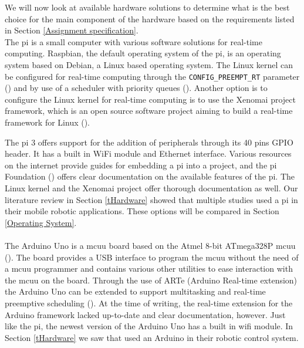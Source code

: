 \documentclass[12pt]{scrreprt}
\begin{document}
We will now look at available hardware solutions to determine what is the best choice for the main component of the hardware based on the requirements listed in Section \ref{Assignment specification}.
\\
The \gls{pi} is a small computer with various software solutions for real-time computing. Raspbian, the default operating system of the \gls{pi}, is an operating system based on Debian, a Linux based operating system. The Linux kernel can be configured for real-time computing through the \texttt{CONFIG_PREEMPT_RT} parameter (\cite{rtwiki}) and by use of a scheduler with priority queues (\cite{linux_scheduling}). Another option is to configure the Linux kernel for real-time computing is to use the Xenomai project framework, which is an open source software project aiming to build a real-time framework for Linux (\cite{xenomai}). 
\par
The \gls{pi} 3 offers support for the addition of peripherals through its 40 pins GPIO header. It has a built in WiFi module and Ethernet interface. Various resources on the internet provide guides for embedding a \gls{pi} into a project, and the \gls{pi} Foundation (\cite{foundation}) offers clear documentation on the available features of the \gls{pi}. The Linux kernel and the Xenomai project offer thorough documentation as well. Our literature review in Section \ref{tHardware} showed that multiple studies used a \gls{pi} in their mobile robotic applications. These options will be compared in Section \ref{Operating System}.
\\\\
The Arduino Uno is a \gls{mcuu} board based on the Atmel 8-bit ATmega328P \gls{mcuu} (\cite{arduinouno}). The board provides a USB interface to program the \gls{mcuu} without the need of a \gls{mcuu} programmer and contains various other utilities to ease interaction with the \gls{mcuu} on the board. Through the use of ARTe (Arduino Real-time extension) the Arduino Uno can be extended to support multitasking and real-time preemptive scheduling (\cite{ARTe}). At the time of writing,  the real-time extension for the Arduino framework lacked up-to-date and clear documentation, however. Just like the \gls{pi}, the newest version of the Arduino Uno has a built in \gls{wifi} module. In Section \ref{tHardware} we saw that \cite{arduino} used an Arduino in their robotic control system.
\\\\
\end{document}

